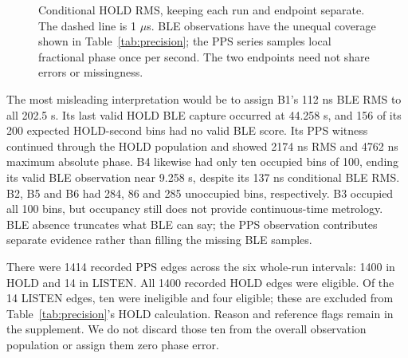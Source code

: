 \documentclass[11pt,letterpaper]{article}
\begin{document}
\begin{figure}[t]\centering
\caption{Conditional HOLD RMS, keeping each run and endpoint separate. The dashed line is 1 $\mu$s. BLE observations have the unequal coverage shown in Table~\ref{tab:precision}; the PPS series samples local fractional phase once per second. The two endpoints need not share errors or missingness.}\label{fig:rms}
\end{figure}

The most misleading interpretation would be to assign B1's 112 ns BLE RMS to all 202.5 s. Its last valid HOLD BLE capture occurred at 44.258 s, and 156 of its 200 expected HOLD-second bins had no valid BLE score. Its PPS witness continued through the HOLD population and showed 2174 ns RMS and 4762 ns maximum absolute phase. B4 likewise had only ten occupied bins of 100, ending its valid BLE observation near 9.258 s, despite its 137 ns conditional BLE RMS. B2, B5 and B6 had 284, 86 and 285 unoccupied bins, respectively. B3 occupied all 100 bins, but occupancy still does not provide continuous-time metrology. BLE absence truncates what BLE can say; the PPS observation contributes separate evidence rather than filling the missing BLE samples.

There were 1414 recorded PPS edges across the six whole-run intervals: 1400 in HOLD and 14 in LISTEN. All 1400 recorded HOLD edges were eligible. Of the 14 LISTEN edges, ten were ineligible and four eligible; these are excluded from Table~\ref{tab:precision}'s HOLD calculation. Reason and reference flags remain in the supplement. We do not discard those ten from the overall observation population or assign them zero phase error.
\end{document}
